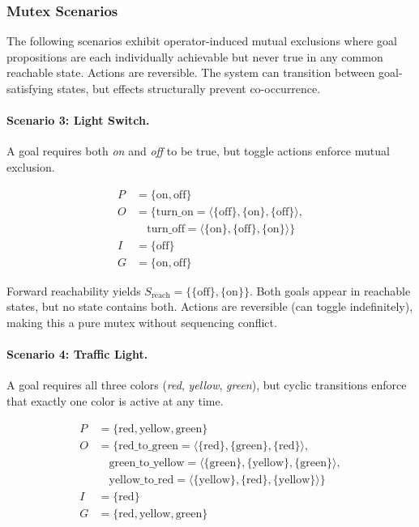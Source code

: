 \subsubsection{Mutex Scenarios}

The following scenarios exhibit operator-induced mutual exclusions where goal propositions are each individually achievable but never true in any common reachable state. Actions are reversible. The system can transition between goal-satisfying states, but effects structurally prevent co-occurrence.

\paragraph{Scenario 3: Light Switch.}

A goal requires both \textit{on} and \textit{off} to be true, but toggle actions enforce mutual exclusion.

\begin{align*}
  P & = \{\text{on}, \text{off}\}                                                              \\
  O & = \{ \text{turn\_on} = \langle \{\text{off}\}, \{\text{on}\}, \{\text{off}\} \rangle,    \\
    & \quad \text{turn\_off} = \langle \{\text{on}\}, \{\text{off}\}, \{\text{on}\} \rangle \} \\
  I & = \{\text{off}\}                                                                         \\
  G & = \{\text{on}, \text{off}\}
\end{align*}

Forward reachability yields $S_{\text{reach}} = \{\{\text{off}\}, \{\text{on}\}\}$. Both goals appear in reachable states, but no state contains both. Actions are reversible (can toggle indefinitely), making this a pure mutex without sequencing conflict.

\paragraph{Scenario 4: Traffic Light.}

A goal requires all three colors (\textit{red}, \textit{yellow}, \textit{green}), but cyclic transitions enforce that exactly one color is active at any time.

\begin{align*}
  P & = \{\text{red}, \text{yellow}, \text{green}\}                                                           \\
  O & = \{ \text{red\_to\_green} = \langle \{\text{red}\}, \{\text{green}\}, \{\text{red}\} \rangle,          \\
    & \quad \text{green\_to\_yellow} = \langle \{\text{green}\}, \{\text{yellow}\}, \{\text{green}\} \rangle, \\
    & \quad \text{yellow\_to\_red} = \langle \{\text{yellow}\}, \{\text{red}\}, \{\text{yellow}\} \rangle \}  \\
  I & = \{\text{red}\}                                                                                        \\
  G & = \{\text{red}, \text{yellow}, \text{green}\}
\end{align*}

